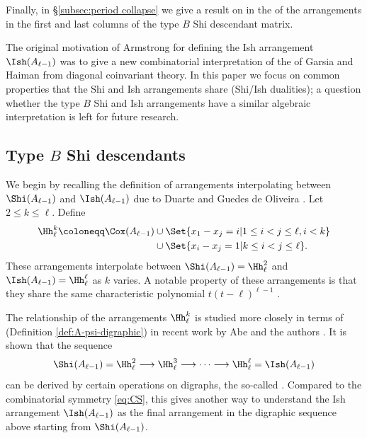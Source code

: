 Finally, in \S\ref{subsec:period collapse} we give a result on  in the  of the arrangements in the first and last columns of the type $B$ Shi descendant matrix. 

The original motivation of Armstrong \cite{Arms13} for defining the Ish arrangement $ \Ish(A_{\ell-1}) $ was to  give a new combinatorial interpretation of the  of Garsia and Haiman from diagonal coinvariant theory.
In this paper we focus on common properties that the Shi and Ish arrangements share (Shi/Ish dualities); a question whether the type $B$ Shi and Ish arrangements have a similar algebraic interpretation is left for future research. 

\subsection{Type \texorpdfstring{$B$}{B} Shi  descendants}
\label{subsec:BShi-des}


We begin by recalling the definition of arrangements interpolating between $\Shi(A_{\ell-1})$ and $\Ish(A_{\ell-1})$ due to Duarte and Guedes de Oliveira \cite{DG18}.
Let $2 \leq k \leq \ell$. Define 
\begin{align*}
\Hh_{\ell}^{k}  \coloneqq \Cox(A_{\ell-1}) 
&\cup \Set{ x_{1}-x_{j}=i  | 1 \leq i < j \leq \ell, i < k} \\
&\cup \Set{ x_{i}-x_{j}=1  | k \leq i < j \leq \ell}. 
\end{align*}
These arrangements  interpolate between $\Shi(A_{\ell-1}) = \Hh_{\ell}^{2} $ and  $ \Ish(A_{\ell-1}) = \Hh_{\ell}^{\ell} $ as $k$ varies. 
A notable property of these arrangements is that they share the same characteristic polynomial $t(t-\ell)^{\ell-1}$ \cite[Theorem 2.2]{DG18}. 
 
 The relationship of the arrangements $\Hh_{\ell}^{k}$ is studied more closely in terms of  (Definition \ref{def:A-psi-digraphic}) in recent work by Abe and the authors \cite{ATT24}. 
 It is shown that the sequence 
$$  \Shi(A_{\ell-1})=\Hh_{\ell}^{2} \longrightarrow\Hh_{\ell}^{3}\longrightarrow\cdots\longrightarrow \Hh_{\ell}^{\ell} =  \Ish(A_{\ell-1}) $$
can be derived by certain operations on digraphs, the so-called    \cite[Definition 2.15 and Theorem 3.13]{ATT24}.
Compared to the combinatorial symmetry \eqref{eq:CS}, this gives another way to understand the Ish arrangement $\Ish(A_{\ell-1}) $ as the final arrangement in the digraphic sequence above starting from $ \Shi(A_{\ell-1})$.

